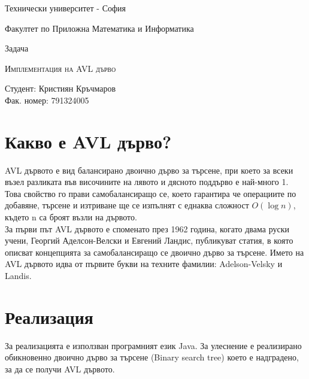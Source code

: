 \documentclass[a4paper,fleqn,12pt]{article}
\begin{document}
\begin{titlepage}
	\setlength{\parindent}{0pt}
	\large
\centering
Технически университет - София \par
Факултет по Приложна Математика и Информатика \par
\vspace{2cm}

{\huge Задача \par}

\vspace{2cm}

\vspace{1cm}
{\LARGE\scshape  Имплементация на AVL дърво \par}

\vfill
\begin{minipage}[t]{.5\linewidth}
	Студент: Кристиян Кръчмаров \\
	Фак. номер: 791324005
\end{minipage}
%

\vspace{2cm}
\raggedright

\end{titlepage}
\tableofcontents
\newpage
{}
\newpage

\section{Какво е AVL дърво?}
AVL дървото е вид балансирано двоично дърво за търсене, при което за всеки възел разликата във височините на лявото и дясното поддърво е най-много 1. 
Това свойство го прави самобалансиращо се, което гарантира че операциите по добавяне, търсене и изтриване ще се изпълнят с еднаква сложност $O(\log n)$, където n са броят възли на дървото.  \\
За първи път AVL дървото е споменато през 1962 година, когато двама руски учени, Георгий Аделсон-Велски и Евгений Ландис, публикуват статия, в която описват концепцията за самобалансиращо се двоично дърво за търсене.
Името на AVL дървото идва от първите букви на техните фамилии: Adelson-Velsky и Landis. \\
\section{Реализация}
За реализацията е използван програмният език Java. За улеснение е реализирано обикновенно двоично дърво за търсене (Binary search tree) което е надградено, за да се получи AVL дървото.
\end{document}
